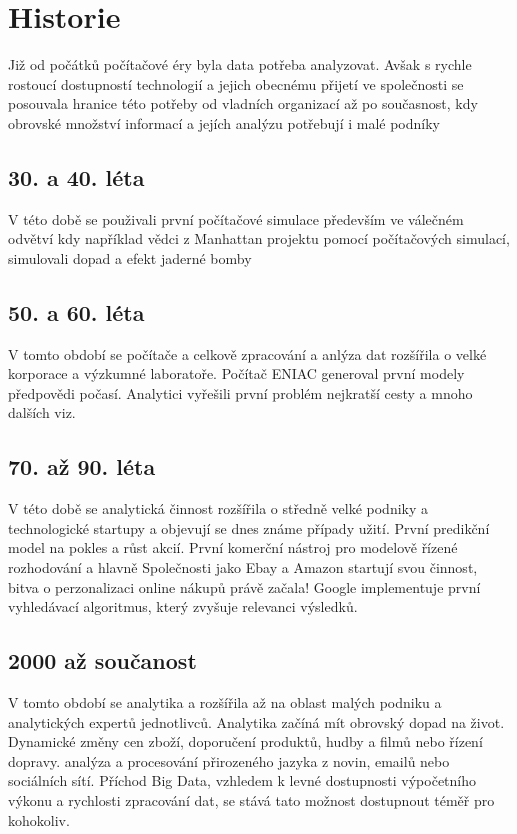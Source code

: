 \documentclass[thesis=M,czech]{FITthesis}[2012/06/26]
\begin{document}
\section{Historie}

Již od počátků počítačové éry byla data potřeba analyzovat. \cite{history} Avšak s rychle rostoucí dostupností technologií a jejich obecnému přijetí ve společnosti se posouvala hranice této potřeby od vladních organizací až po současnost, kdy obrovské množství informací a jejích analýzu potřebují i malé podníky

\subsection{30. a 40. léta}
V této době se použivali první počítačové simulace především ve válečném odvětví kdy například vědci z Manhattan projektu pomocí počítačových simulací, simulovali dopad a efekt jaderné bomby

\subsection{50. a 60. léta}
V tomto období se počítače a celkově zpracování a anlýza dat rozšířila o velké korporace a výzkumné laboratoře. Počítač ENIAC generoval první modely předpovědi počasí. Analytici vyřešili první problém nejkratší cesty a mnoho dalších viz. \cite{history}

\subsection{70. až 90. léta}
V této době se analytická činnost rozšířila o středně velké podniky a technologické startupy a objevují se dnes známe případy užití. První predikční model na pokles a růst akcií. První komerční nástroj pro modelově řízené rozhodování a hlavně Společnosti jako Ebay a Amazon startují svou činnost, bitva o perzonalizaci online nákupů právě začala! Google implementuje první vyhledávací algoritmus, který zvyšuje relevanci výsledků.

\subsection{2000 až součanost}
V tomto období se analytika a rozšířila až na oblast malých podniku a analytických expertů jednotlivců. Analytika začíná mít obrovský dopad na život. Dynamické změny cen zboží, doporučení produktů, hudby a filmů nebo řízení dopravy. analýza a procesování přirozeného jazyka z novin, emailů nebo sociálních sítí. Příchod Big Data, vzhledem k levné dostupnosti výpočetního výkonu a rychlosti zpracování dat, se stává tato možnost dostupnout téměř pro kohokoliv.
\end{document}
